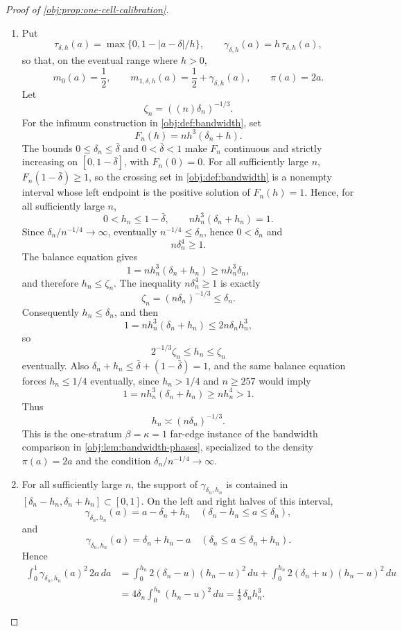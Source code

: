 \documentclass[11pt]{article}
\begin{document}
\begin{proof}[Proof of \cref{obj:prop:one-cell-calibration}]
\begin{enumerate}
\item Put
\[
\tau_{\delta,h}(a)=\max\{0,1-|a-\delta|/h\},
\qquad
\gamma_{\delta,h}(a)=h\,\tau_{\delta,h}(a),
\]
so that, on the eventual range where \(h>0\),
\[
m_0(a)=\frac12,
\qquad
m_{1,\delta,h}(a)=\frac12+\gamma_{\delta,h}(a),
\qquad
\pi(a)=2a .
\]
Let
\[
\zeta_n=((n)\delta_n)^{-1/3}.
\]
For the infimum construction in \cref{obj:def:bandwidth}, set
\[
F_n(h)=n h^3(\delta_n+h).
\]
The bounds \(0\le \delta_n\le\bar\delta\) and \(0<\bar\delta<1\) make \(F_n\) continuous and strictly increasing on \([0,1-\bar\delta]\), with \(F_n(0)=0\).  For all sufficiently large \(n\), \(F_n(1-\bar\delta)\ge1\), so the crossing set in \cref{obj:def:bandwidth} is a nonempty interval whose left endpoint is the positive solution of \(F_n(h)=1\).  Hence, for all sufficiently large \(n\),
\[
0<h_n\le 1-\bar\delta,
\qquad
n h_n^3(\delta_n+h_n)=1 .
\]
Since \(\delta_n/n^{-1/4}\to\infty\), eventually \(n^{-1/4}\le \delta_n\), hence \(0<\delta_n\) and
\[
n\delta_n^4\ge 1 .
\]
The balance equation gives
\[
1=n h_n^3(\delta_n+h_n)\ge n h_n^3\delta_n,
\]
and therefore \(h_n\le \zeta_n\).  The inequality \(n\delta_n^4\ge1\) is exactly
\[
\zeta_n=(n\delta_n)^{-1/3}\le \delta_n .
\]
Consequently \(h_n\le\delta_n\), and then
\[
1=n h_n^3(\delta_n+h_n)\le 2n\delta_n h_n^3,
\]
so
\[
2^{-1/3}\zeta_n\le h_n\le\zeta_n
\]
eventually.  Also \(\delta_n+h_n\le\bar\delta+(1-\bar\delta)=1\), and the same balance equation forces \(h_n\le1/4\) eventually, since \(h_n>1/4\) and \(n\ge257\) would imply
\[
1=n h_n^3(\delta_n+h_n)\ge n h_n^4>1 .
\]
Thus
\[
h_n\asymp (n\delta_n)^{-1/3}.
\]
This is the one-stratum \(\beta=\kappa=1\) far-edge instance of the bandwidth
comparison in \cref{obj:lem:bandwidth-phases}, specialized to the density
\(\pi(a)=2a\) and the condition \(\delta_n/n^{-1/4}\to\infty\).

\item For all sufficiently large \(n\), the support of
\(\gamma_{\delta_n,h_n}\) is contained in
\([\delta_n-h_n,\delta_n+h_n]\subset[0,1]\).  On the left and right halves of
this interval,
\[
\gamma_{\delta_n,h_n}(a)=a-\delta_n+h_n
\quad(\delta_n-h_n\le a\le\delta_n),
\]
and
\[
\gamma_{\delta_n,h_n}(a)=\delta_n+h_n-a
\quad(\delta_n\le a\le\delta_n+h_n).
\]
Hence
\[
\begin{aligned}
\int_0^1 \gamma_{\delta_n,h_n}(a)^2\,2a\,da
&=
\int_0^{h_n}2(\delta_n-u)(h_n-u)^2\,du
+\int_0^{h_n}2(\delta_n+u)(h_n-u)^2\,du  \\
&=
4\delta_n\int_0^{h_n}(h_n-u)^2\,du
=
\frac43\,\delta_n h_n^3 .
\end{aligned}
\]


\end{enumerate}
\end{proof}
\end{document}
